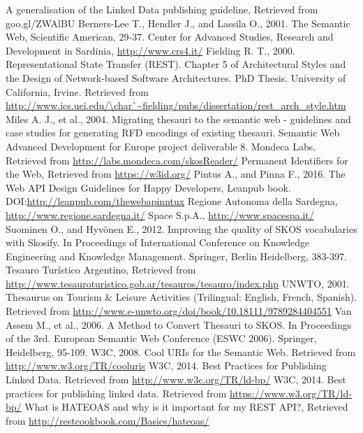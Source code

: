 \documentclass[runningheads,a4paper]{llncs}
\begin{document}
\begin{thebibliography}{4}

 A generalisation of the Linked Data publishing guideline, Retrieved from goo.gl/ZWAlBU
 Berners-Lee T., Hendler J., and Lassila O., 2001. The Semantic Web, Scientific American, 29-37.
 Center for Advanced Studies, Research and Development in Sardinia, \url{http://www.crs4.it/}
 Fielding R. T., 2000. Representational State Transfer (REST). Chapter 5 of Architectural Styles and the Design of Network-based Software Architectures. PhD Thesis. University of California, Irvine. Retrieved from \url{http://www.ics.uci.edu/\char`\~fielding/pubs/dissertation/rest\_arch\_style.htm}
 Miles A. J., et al., 2004. Migrating thesauri to the semantic web - guidelines and case studies for generating RFD encodings of existing thesauri. Semantic Web Advanced Development for Europe project deliverable 8.
 Mondeca Labs. Retrieved from \url{http://labs.mondeca.com/skosReader/}
 Permanent Identifiers for the Web, Retrieved from \url{https://w3id.org/}
 Pintus A., and Pinna F., 2016. The Web API Design Guidelines for Happy Developers, Leanpub book. DOI:\url{http://leanpub.com/thewebapinntux}
 Regione Autonoma della Sardegna, \url{http://www.regione.sardegna.it/}
 Space S.p.A., \url{http://www.spacespa.it/}
 Suominen O., and Hyvönen E., 2012. Improving the quality of SKOS vocabularies with Skosify. In Proceedings of International Conference on Knowledge Engineering and Knowledge Management. Springer, Berlin Heidelberg, 383-397.
 Tesauro Tur\'istico Argentino, Retrieved from \url{http://www.tesauroturistico.gob.ar/tesauros/tesauro/index.php}
 UNWTO, 2001. Thesaurus on Tourism \& Leisure Activities (Trilingual: English, French, Spanish). Retrieved from \url{http://www.e-unwto.org/doi/book/10.18111/9789284404551}
 Van Assem M., et al., 2006. A Method to Convert Thesauri to SKOS. In Proceedings of the 3rd. European Semantic Web Conference (ESWC 2006). Springer, Heidelberg, 95-109.
 W3C, 2008. Cool URIs for the Semantic Web. Retrieved from \url{http://www.w3.org/TR/cooluris}
 W3C, 2014. Best Practices for Publishing Linked Data. Retrieved from \url{http://www.w3c.org/TR/ld-bp/}
 W3C, 2014. Best practices for publishing linked data. Retrieved from \url{https://www.w3.org/TR/ld-bp/}
 What is HATEOAS and why is it important for my REST API?, Retrieved from \url{http://restcookbook.com/Basics/hateoas/}

\end{thebibliography}
\end{document}
